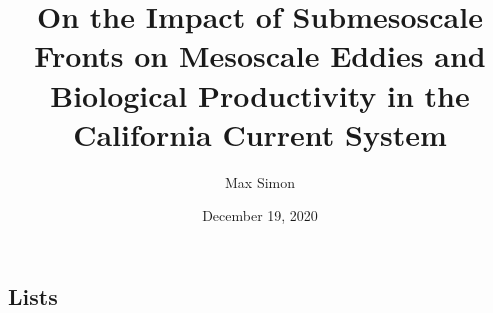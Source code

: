 \documentclass[
    12pt, %
    parskip=half, %
    print, %
    oneside, %
]{thesis}
\title{On the Impact of Submesoscale Fronts on Mesoscale Eddies and Biological Productivity in the California Current System}
\author{Max Simon}
\date{December 19, 2020}
\begin{document}
	
	\graphicspath{{figures/}}
	
 	
 	

 	\tableofcontents
 	
 	
 	
 	
 	
 	
 	
 	

	
	
	
 	
	\begin{appendices}
	    
		\chapter{Lists}
		\listoffigures
		\listoftables
		\printbibliography
	\end{appendices}
	
	
\end{document}
